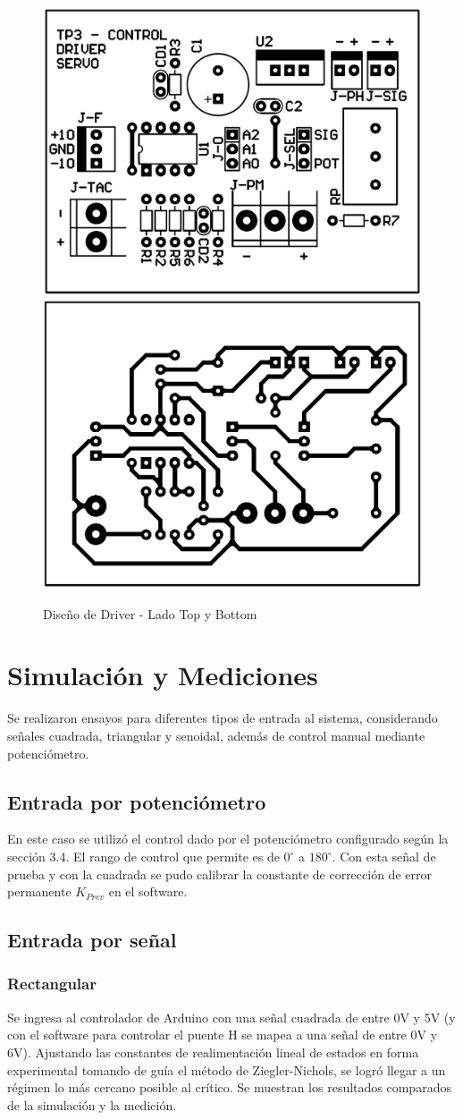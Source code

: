 \documentclass{article}
\begin{document}
\begin{figure}[H]
\centering
\includegraphics[width=0.35\linewidth]{../Images/Top.png}
\centering
\includegraphics[width=0.35\linewidth]{../Images/Bottom.png}
\caption{Diseño de Driver - Lado Top y Bottom}
\end{figure}


\section{Simulación y Mediciones}

Se realizaron ensayos para diferentes tipos de entrada al sistema, considerando señales cuadrada, triangular y senoidal, además de control manual mediante potenciómetro.

\subsection{Entrada por potenciómetro}

En este caso se utilizó el control dado por el potenciómetro configurado según la sección 3.4. El rango de control que permite es de $0^{\circ}$ a $180^{\circ}$. Con esta señal de prueba y con la cuadrada se pudo calibrar la constante de corrección de error permanente $K_{Prev}$ en el software.

\subsection{Entrada por señal}

\subsubsection{Rectangular}
Se ingresa al controlador de Arduino con una señal cuadrada de entre 0V y 5V (y con el software para controlar el puente H se mapea a una señal de entre 0V y 6V). Ajustando las constantes de realimentación lineal de estados en forma experimental tomando de guía el método de Ziegler-Nichols, se logró llegar a un régimen lo más cercano posible al crítico. Se muestran los resultados comparados de la simulación y la medición.
\end{document}
